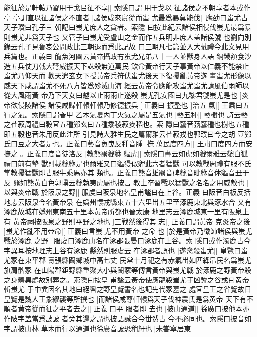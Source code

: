 %
能征於是軒轅乃習用干戈㠯征不享|[%
索隱曰謂%
用干戈以%
%
征諸侯之不朝享者本或作亭%
亭訓直以征諸侯之不直者%
]諸侯咸來賔從而蚩%
%
尤最爲暴莫能伐|[%
應劭曰蚩尤古天子瓉曰孔子三%
朝記曰蚩尤庶人之貪者。索隱%
%
曰按此紀云諸侯相侵伐蚩尤最爲暴則蚩尤非爲天子也%
又管子曰蚩尤受盧山之金而作五兵明非庶人盖諸侯號%
%
也劉向別錄云孔子見魯哀公問政比三朝退而爲此記故%
曰三朝凡七篇並入大戴禮今此文見用兵篇也。正義曰%
%
龍魚河圖云黃帝攝政有蚩尤兄弟八十一人並獸身人語%
銅鐵額食沙造五兵仗刀戟大弩威振天下誅殺無道萬民%
%
欽命黃帝行天子事黃帝以仁義不能禁止蚩尤乃仰天而%
歎天遣玄女下授黃帝兵符伏蚩尤後天下復擾亂黃帝遂%
%
畫蚩尤形像以威天下咸謂蚩尤不死八方皆爲殄滅山海%
經云黃帝令應龍攻蚩尤蚩尤請風伯雨師以從大風雨黃%
%
帝乃下天女曰魃以止雨雨止遂殺%
蚩尤孔安國曰九黎君號蚩尤是也%
]炎帝欲侵陵諸侯%
%
諸侯咸歸軒轅軒轅乃修德振兵|[%
正義曰%
振整也%
]治五%
%
氣|[%
王肅曰五行之氣。索隱曰謂春甲%
乙木氣夏丙丁火氣之屬是五氣也%
]藝五種|[%
藝樹也%
詩云藝%
%
之荏菽周禮曰榖冝五種鄭玄曰五種黍稷菽麥稻也。索%
隱曰藝音蓺藝種也樹也五種即五穀也音朱用反此注所%
%
引見詩大雅生民之篇爾雅云荏菽戎也郭璞曰今之胡%
豆鄭氏曰豆之大者是也。正義曰藝音魚曳反種音腫%
]撫%
%
萬民度四方|[%
王肅曰度四方而安撫之%
。正義曰度音徒洛反%
]教熊羆貔貅%
%
貙虎|[%
索隱曰書云如虎如貔爾雅云貔白狐禮曰前有摯%
獸則載貔貅是也爾雅又曰貙獌似貍此六者猛獸%
%
可以教戰周禮有服不氏掌教擾猛獸即古服牛乘馬亦其%
類也。正義曰熊音雄羆音碑貔音毗貅音休貙音丑于反%
%
羆如熊黃白色郭璞云貔執夷虎屬也按言%
教士卒習戰以猛獸之名名之用威敵也%
]以與炎帝戰%
%
於阪泉之野|[%
服䖍曰阪泉地名皇甫謐曰在上谷。正義%
曰阪音白板反括地志云阪泉今名黃帝泉%
%
在嬀州懷戎縣東五十六里岀五里至涿鹿東北與涿水合%
又有涿鹿故城在嬀州東南五十里本黃帝所都也晉太康%
%
地里志云涿鹿城東一里有阪泉上有%
黃帝祠按阪泉之野則平野之地也%
]三戰然後得其%
%
志|[%
正義曰謂黃帝%
克炎帝之後%
]蚩尤作亂不用帝命|[%
正義曰言蚩%
尤不用黃帝%
%
之命%
也%
]於是黃帝乃徴師諸侯與蚩尤戰於涿鹿%
%
之野|[%
服䖍曰涿鹿山名在涿郡張晏曰涿鹿在上谷。索%
隱曰或作濁鹿古今字異耳按地理志上谷有涿鹿%
%
縣然則服䖍云%
在涿郡者誤也%
]遂禽殺蚩尤|[%
皇覽曰蚩尤冢在東平郡%
壽張縣闞鄉城中髙七丈%
%
民常十月祀之有赤氣岀如匹絳帛民名爲蚩尤旗肩髀冢%
在山陽郡鉅野縣重聚大小與闞冢等傳言黃帝與蚩尤戰%
%
於涿鹿之野黃帝殺之身體異處故別葬之。索隱曰按皇%
甫謐云黃帝使應龍殺蚩尤于凶黎之谷或曰黄帝斬蚩尤%
%
于中兾因名其地曰絕轡之野皇覽書名也記先代冢墓之%
處冝皇王之省覽故日皇覽是魏人王象繆襲等所撰也%
%
]而諸侯咸尊軒轅爲天子伐神農氏是爲黄帝%
%
天下有不順者黄帝從而征之平者去之|[%
正義%
曰平%
%
服者即%
去也%
]披山通道|[%
徐廣曰披他本亦作陂字盖當爲詖詖%
者旁其邊之謂也披語誠合今丗然古%
%
今不必同也。索隱曰披音如字謂披山林%
草木而行以通道也徐廣音詖恐稍紆也%
]未甞寧居東%
